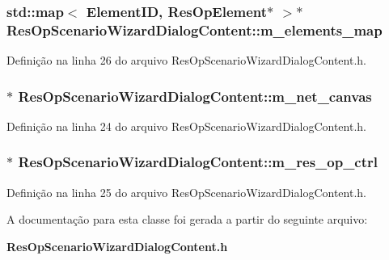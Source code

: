 \subsubsection[{m\+\_\+elements\+\_\+map}]{\setlength{\rightskip}{0pt plus 5cm}std\+::map$<$ {\bf Element\+ID}, {\bf Res\+Op\+Element}$\ast$ $>$$\ast$ Res\+Op\+Scenario\+Wizard\+Dialog\+Content\+::m\+\_\+elements\+\_\+map\hspace{0.3cm}{\ttfamily [protected]}}\label{class_res_op_scenario_wizard_dialog_content_a0a8ee182641f33ec8093f0a56870deb4}


Definição na linha 26 do arquivo Res\+Op\+Scenario\+Wizard\+Dialog\+Content.\+h.

\subsubsection[{m\+\_\+net\+\_\+canvas}]{$\ast$ Res\+Op\+Scenario\+Wizard\+Dialog\+Content\+::m\+\_\+net\+\_\+canvas\hspace{0.3cm}{\ttfamily [protected]}}\label{class_res_op_scenario_wizard_dialog_content_a4511b75a57643241b7a9dfd7f5978fa4}


Definição na linha 24 do arquivo Res\+Op\+Scenario\+Wizard\+Dialog\+Content.\+h.

\subsubsection[{m\+\_\+res\+\_\+op\+\_\+ctrl}]{$\ast$ Res\+Op\+Scenario\+Wizard\+Dialog\+Content\+::m\+\_\+res\+\_\+op\+\_\+ctrl\hspace{0.3cm}{\ttfamily [protected]}}\label{class_res_op_scenario_wizard_dialog_content_aa4de370cd5e70770590b871d09f7a779}


Definição na linha 25 do arquivo Res\+Op\+Scenario\+Wizard\+Dialog\+Content.\+h.



A documentação para esta classe foi gerada a partir do seguinte arquivo\+:\begin{DoxyCompactItemize}
\item 
{\bf Res\+Op\+Scenario\+Wizard\+Dialog\+Content.\+h}\end{DoxyCompactItemize}
